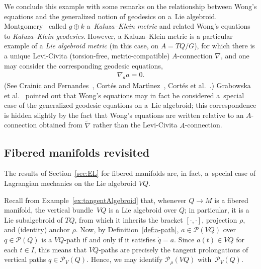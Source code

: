\documentclass[10pt,a4paper]{amsart}
\numberwithin{equation}{section}
\begin{document}
\begin{Example}
 We conclude this example with some remarks on the relationship between Wong's equations and the generalized notion of geodesics on a~Lie algebroid. Montgomery~\cite{Montgomery1990} called $ g \oplus k $ a~\emph{Kaluza--Klein metric} and related Wong's equations to \emph{Kaluza--Klein geodesics}. However, a Kaluza--Klein metric is a particular example of a \emph{Lie algebroid metric} (in this case, on $ A = T Q / G $), for which there is a unique Levi-Civita
 (torsion-free, metric-compatible) $A$-connection $ \nabla $, and one may consider the corresponding geodesic equations,
 \begin{gather*}
 \nabla _a a = 0 .
 \end{gather*}
(See Crainic and Fernandes~\cite{CrFe2003}, Cort\'es and Mart\'{\i}nez~\cite{CoMa2004}, Cort\'es et al.~\cite{CoLeMaMaMa2006}.) Grabowska et al.~\cite{GrUrGr2006} pointed out that Wong's equations may in fact be considered a~special case of the generalized geodesic equations on a~Lie algebroid; this correspondence is hidden slightly by the fact that Wong's equations are written relative to an $A$-connection obtained from $ \widetilde{ \nabla } $ rather than the Levi-Civita $A$-connection.
\end{Example}

\subsection{Fibered manifolds revisited}

The results of Section~\ref{sec:EL} for f\/ibered manifolds are, in fact, a~special case of Lagrangian mechanics on the Lie algebroid $ V Q $.

Recall from Example~\ref{ex:tangentAlgebroid} that, whenever $ Q \rightarrow M $ is a f\/ibered manifold, the vertical bundle~$ V Q $ is a Lie algebroid over $Q$; in particular, it is a Lie subalgebroid of $ T Q $, from which it inherits the bracket $ [ \cdot , \cdot ] $, projection $ \rho $, and (identity) anchor $ \rho $. Now, by Def\/inition~\ref{def:a-path}, $ a \in \mathcal{P} ( V Q ) $ over $ q \in \mathcal{P} (Q) $ is a $ V Q $-path if and only if it
satisf\/ies $ \dot{q} = a $. Since $ a (t) \in V Q $ for each $ t \in I $, this means that $ V Q $-paths are precisely the tangent prolongations of vertical paths $ q \in \mathcal{P} _V (Q) $. Hence, we may identify $ \mathcal{P} _\rho ( V Q ) $ with~$ \mathcal{P} _V (Q) $.
\end{document}

